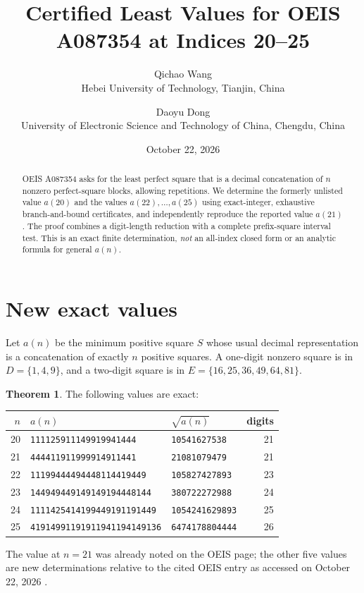 \documentclass[10pt]{article}
\title{Certified Least Values for OEIS A087354 at Indices 20--25}
\author{Qichao Wang\\{\small Hebei University of Technology, Tianjin, China}
\and Daoyu Dong\\{\small University of Electronic Science and Technology of China, Chengdu, China}}
\date{October 22, 2026}
\theoremstyle{definition}
\newtheorem{theorem}{Theorem}
\begin{document}
\maketitle
\begin{abstract}
OEIS A087354 asks for the least perfect square that is a decimal
concatenation of $n$ nonzero perfect-square blocks, allowing repetitions.
We determine the formerly unlisted value $a(20)$ and the values
$a(22),\ldots,a(25)$ using exact-integer, exhaustive branch-and-bound
certificates, and independently reproduce the reported value $a(21)$.
The proof combines a digit-length reduction with a complete prefix-square
interval test. This is an exact finite determination, \emph{not} an
all-index closed form or an analytic formula for general $a(n)$.
\end{abstract}

\section{New exact values}
Let $a(n)$ be the minimum positive square $S$ whose usual decimal
representation is a concatenation of exactly $n$ positive squares.
A one-digit nonzero square is in $D=\{1,4,9\}$, and a two-digit
square is in $E=\{16,25,36,49,64,81\}$.

\begin{theorem}\label{thm:values}
The following values are exact:
\begin{center}\small
\begin{tabular}{@{}rllr@{}}\toprule
$n$ & $a(n)$ & $\sqrt{a(n)}$ & digits\\\midrule
20 & \texttt{111125911149919941444} & \texttt{10541627538} &21\\
21 & \texttt{444411911999914911441} & \texttt{21081079479} &21\\
22 & \texttt{11199444494448114419449} & \texttt{105827427893} &23\\
23 & \texttt{144949449149149194448144} & \texttt{380722272988} &24\\
24 & \texttt{1111425414199449191191449} & \texttt{1054241629893} &25\\
25 & \texttt{41914991191911941194149136} & \texttt{6474178804444} &26\\\bottomrule
\end{tabular}
\end{center}
The value at $n=21$ was already noted on the OEIS page; the other
five values are new determinations relative to the cited OEIS entry
as accessed on October 22, 2026 \cite{oeis}.
\end{theorem}
\end{document}
